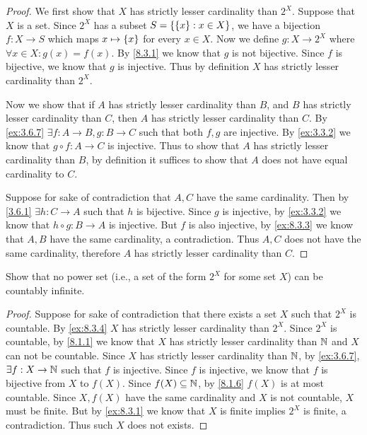 \begin{proof}
  We first show that \(X\) has strictly lesser cardinality than \(2^X\).
  Suppose that \(X\) is a set.
  Since \(2^X\) has a subset \(S = \left\lbrace\left\lbrace x\right\rbrace : x \in X\right\rbrace\), we have a bijection \(f : X \to S\) which maps \(x \mapsto \left\lbrace x\right\rbrace\) for every \(x \in X\).
  Now we define \(g : X \to 2^X\) where \(\forall x \in X : g(x) = f(x)\).
  By \cref{8.3.1} we know that \(g\) is not bijective.
  Since \(f\) is bijective, we know that \(g\) is injective.
  Thus by definition \(X\) has strictly lesser cardinality than \(2^X\).

  Now we show that if \(A\) has strictly lesser cardinality than \(B\), and \(B\) has strictly lesser cardinality than \(C\), then \(A\) has strictly lesser cardinality than \(C\).
  By \cref{ex:3.6.7} \(\exists f : A \to B, g : B \to C\) such that both \(f, g\) are injective.
  By \cref{ex:3.3.2} we know that \(g \circ f : A \to C\) is injective.
  Thus to show that \(A\) has strictly lesser cardinality than \(B\), by definition it suffices to show that \(A\) does not have equal cardinality to \(C\).

  Suppose for sake of contradiction that \(A, C\) have the same cardinality.
  Then by \cref{3.6.1} \(\exists h : C \to A\) such that \(h\) is bijective.
  Since \(g\) is injective, by \cref{ex:3.3.2} we know that \(h \circ g : B \to A\) is injective.
  But \(f\) is also injective, by \cref{ex:8.3.3} we know that \(A, B\) have the same cardinality, a contradiction.
  Thus \(A, C\) does not have the same cardinality, therefore \(A\) has strictly lesser cardinality than \(C\).
\end{proof}

\begin{ex}\label{ex:8.3.5}
  Show that no power set (i.e., a set of the form \(2^X\) for some set \(X\)) can be countably infinite.
\end{ex}

\begin{proof}
  Suppose for sake of contradiction that there exists a set \(X\) such that \(2^X\) is countable.
  By \cref{ex:8.3.4} \(X\) has strictly lesser cardinality than \(2^X\).
  Since \(2^X\) is countable, by \cref{8.1.1} we know that \(X\) has strictly lesser cardinality than \(\mathbb{N}\) and \(X\) can not be countable.
  Since \(X\) has strictly lesser cardinality than \(\mathbb{N}\), by \cref{ex:3.6.7}, \(\exists f : X \to \mathbb{N}\) such that \(f\) is injective.
  Since \(f\) is injective, we know that \(f\) is bijective from \(X\) to \(f(X)\).
  Since \(f(X) \subseteq \mathbb{N}\), by \cref{8.1.6} \(f(X)\) is at most countable.
  Since \(X, f(X)\) have the same cardinality and \(X\) is not countable, \(X\) must be finite.
  But by \cref{ex:8.3.1} we know that \(X\) is finite implies \(2^X\) is finite, a contradiction.
  Thus such \(X\) does not exists.
\end{proof}
